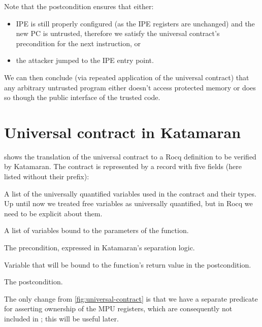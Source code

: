 Note that the postcondition ensures that either:
\begin{itemize}
\item IPE is still properly configured (as the IPE registers are unchanged) and the new PC is untrusted, therefore we satisfy the universal contract's precondition for the next instruction, or
\item the attacker jumped to the IPE entry point.
\end{itemize}
We can then conclude (via repeated application of the universal contract) that any arbitrary untrusted program either doesn't access protected memory or does so though the public interface of the trusted code.

\section{Universal contract in Katamaran}

 shows the translation of the universal contract to a Rocq definition to be verified by Katamaran. The contract is represented by a record with five fields (here listed without their  prefix):
\begin{labeling}{}
\item[\coq{logic_variables}] A list of the universally quantified variables used in the contract and their types. Up until now we treated free variables as universally quantified, but in Rocq we need to be explicit about them.
\item[\coq{localstore}] A list of variables bound to the parameters of the function.
\item[\coq{precondition}] The precondition, expressed in Katamaran's separation logic.

\item[\coq{result}] Variable that will be bound to the function's return value in the postcondition.
\item[\coq{postcondition}] The postcondition.
\end{labeling}

The only change from \cref{fig:universal-contract} is that we have a separate predicate  for asserting ownership of the MPU registers, which are consequently not included in ; this will be useful later.

